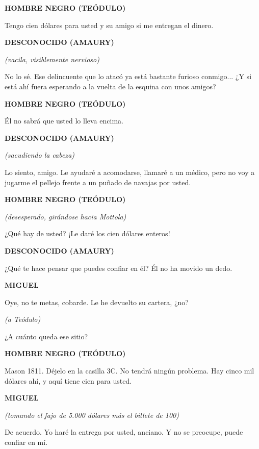 \documentclass[11pt]{report}
\newenvironment{dialogue}[1]{
    \vspace{0.5em}\par\begin{center}\textbf{\MakeUppercase{#1}}\end{center}\vspace{-0.5em}
    \begin{list}{}{
        \leftmargin=1.5in
        \rightmargin=1.5in
        \parsep=0pt
    }\item[]
}{
    \end{list}\vspace{0.5em}
}
\newcommand{\parenthetical}[1]{\vspace{-0.3em}\begin{center}\textit{(#1)}\end{center}\vspace{-0.3em}}
\begin{document}
\begin{dialogue}{Hombre Negro (Teódulo)}
Tengo cien dólares para usted y su amigo si me entregan el dinero.
\end{dialogue}

\begin{dialogue}{Desconocido (Amaury)}
\parenthetical{vacila, visiblemente nervioso}
No lo sé. Ese delincuente que lo atacó ya está bastante furioso conmigo... ¿Y si está ahí fuera esperando a la vuelta de la esquina con unos amigos?
\end{dialogue}

\begin{dialogue}{Hombre Negro (Teódulo)}
Él no sabrá que usted lo lleva encima.
\end{dialogue}

\begin{dialogue}{Desconocido (Amaury)}
\parenthetical{sacudiendo la cabeza}
Lo siento, amigo. Le ayudaré a acomodarse, llamaré a un médico, pero no voy a jugarme el pellejo frente a un puñado de navajas por usted.
\end{dialogue}

\begin{dialogue}{Hombre Negro (Teódulo)}
\parenthetical{desesperado, girándose hacia Mottola}
¿Qué hay de usted? ¡Le daré los cien dólares enteros!
\end{dialogue}

\begin{dialogue}{Desconocido (Amaury)}
¿Qué te hace pensar que puedes confiar en él? Él no ha movido un dedo.
\end{dialogue}

\begin{dialogue}{Miguel}
Oye, no te metas, cobarde. Le he devuelto su cartera, ¿no?
\parenthetical{a Teódulo}
¿A cuánto queda ese sitio?
\end{dialogue}

\begin{dialogue}{Hombre Negro (Teódulo)}
Mason 1811. Déjelo en la casilla 3C. No tendrá ningún problema. Hay cinco mil dólares ahí, y aquí tiene cien para usted.
\end{dialogue}

\begin{dialogue}{Miguel}
\parenthetical{tomando el fajo de 5.000 dólares más el billete de 100}
De acuerdo. Yo haré la entrega por usted, anciano. Y no se preocupe, puede confiar en mí.
\end{dialogue}
\end{document}
